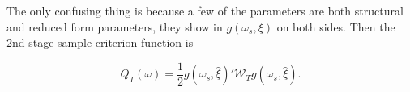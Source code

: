 \documentclass[11pt, letterpaper, twoside, final]{article}
\newcommand*{\W}{\mathcal{W}}
\begin{document}

The only confusing thing is because a few of the parameters are both structural and reduced form parameters, they
show in $g\left(\omega_s, \xi\right)$ on both sides.
Then the 2nd-stage sample criterion function is 

\begin{equation}
    Q_T(\omega) = \frac{1}{2} g\left(\omega_s, \widehat{\xi}\right)' \W_{T} g\left(\omega_s, \widehat{\xi}\right).
\end{equation}
\end{document}
